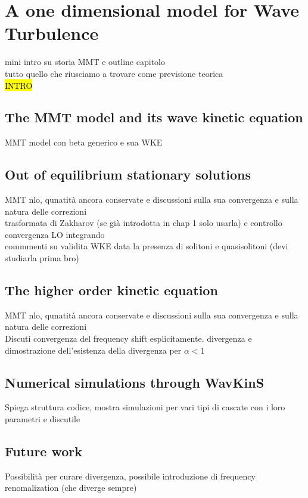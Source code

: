 

\newpage
\vphantom{}
\section{A one dimensional model for Wave Turbulence}
    mini intro su storia MMT e outline capitolo \\
    tutto quello che riusciamo a trovare come previsione teorica \\
    \hl{INTRO}\\
    \subsection{The MMT model and its wave kinetic equation}

    MMT model con beta generico e sua WKE\\
    \subsection{Out of equilibrium stationary solutions}

    MMT nlo, qunatità ancora conservate e discussioni sulla sua convergenza e sulla natura delle correzioni\\
    trasformata di Zakharov (se già introdotta in chap 1 solo usarla) e controllo convergenza LO integrando\\
    commmenti su validita WKE data la presenza di solitoni e quasisolitoni (devi studiarla prima bro)\\
    \subsection{The higher order kinetic equation}

    MMT nlo, qunatità ancora conservate e discussioni sulla sua convergenza e sulla natura delle correzioni\\
    Discuti convergenza del frequency shift esplicitamente.
    divergenza e dimostrazione dell'esistenza della divergenza per $\alpha < 1$\\
    \subsection{Numerical simulations through WavKinS}

    Spiega struttura codice, mostra simulazioni per vari tipi di cascate con i loro parametri e discutile
    \subsection{Future work}
    
    Possibilità per curare divergenza, possibile introduzione di frequency renomalization (che diverge sempre)

